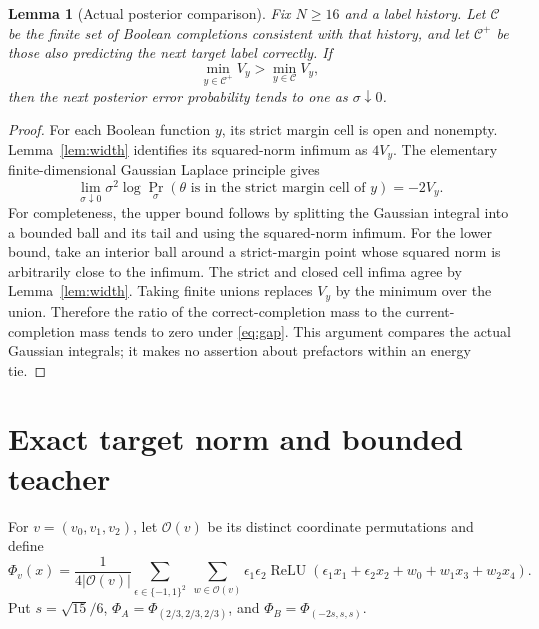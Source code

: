 \documentclass[11pt]{article}
\newtheorem{lemma}[theorem]{Lemma}
\theoremstyle{remark}\newtheorem{remark}[theorem]{Remark}
\newcommand{\relu}{\operatorname{ReLU}}
\newcommand{\1}{\mathbf 1}
\begin{document}
\begin{lemma}[Actual posterior comparison]\label{lem:laplace}
Fix $N\ge16$ and a label history. Let $\mathcal C$ be the finite set of Boolean completions consistent with that history, and let $\mathcal C^+$ be those also predicting the next target label correctly. If
\[
\min_{y\in\mathcal C^+}V_y>\min_{y\in\mathcal C}V_y,
\tag{7}\label{eq:gap}
\]
then the next posterior error probability tends to one as $\sigma\downarrow0$.
\end{lemma}
\begin{proof}
For each Boolean function $y$, its strict margin cell is open and nonempty. Lemma~\ref{lem:width} identifies its squared-norm infimum as $4V_y$. The elementary finite-dimensional Gaussian Laplace principle gives
\[
\lim_{\sigma\downarrow0}\sigma^2\log\Pr_\sigma(\theta\text{ is in the strict margin cell of }y)=-2V_y.
\]
For completeness, the upper bound follows by splitting the Gaussian integral into a bounded ball and its tail and using the squared-norm infimum. For the lower bound, take an interior ball around a strict-margin point whose squared norm is arbitrarily close to the infimum. The strict and closed cell infima agree by Lemma~\ref{lem:width}. Taking finite unions replaces $V_y$ by the minimum over the union. Therefore the ratio of the correct-completion mass to the current-completion mass tends to zero under \eqref{eq:gap}. This argument compares the actual Gaussian integrals; it makes no assertion about prefactors within an energy tie.
\end{proof}

\section{Exact target norm and bounded teacher}
For $v=(v_0,v_1,v_2)$, let $\mathcal O(v)$ be its distinct coordinate permutations and define
\[
\Phi_v(x)=\frac{1}{4|\mathcal O(v)|}
\sum_{\epsilon\in\{-1,1\}^2}\ \sum_{w\in\mathcal O(v)}
\epsilon_1\epsilon_2\relu(\epsilon_1x_1+\epsilon_2x_2+w_0+w_1x_3+w_2x_4).
\tag{8}\label{eq:families}
\]
Put $s=\sqrt{15}/6$, $\Phi_A=\Phi_{(2/3,2/3,2/3)}$, and $\Phi_B=\Phi_{(-2s,s,s)}$.
\end{document}
